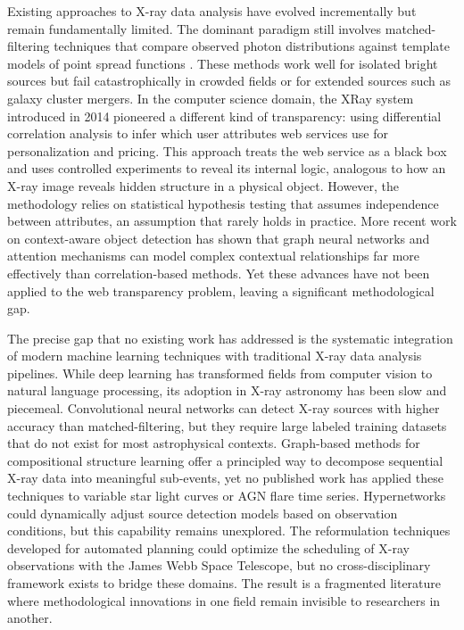 \documentclass[conference]{IEEEtran}
\begin{document}
Existing approaches to X-ray data analysis have evolved incrementally but remain fundamentally limited. The dominant paradigm still involves matched-filtering techniques that compare observed photon distributions against template models of point spread functions \cite{r3}. These methods work well for isolated bright sources but fail catastrophically in crowded fields or for extended sources such as galaxy cluster mergers. In the computer science domain, the XRay system introduced in 2014 \cite{r3} pioneered a different kind of transparency: using differential correlation analysis to infer which user attributes web services use for personalization and pricing. This approach treats the web service as a black box and uses controlled experiments to reveal its internal logic, analogous to how an X-ray image reveals hidden structure in a physical object. However, the methodology relies on statistical hypothesis testing that assumes independence between attributes, an assumption that rarely holds in practice. More recent work on context-aware object detection \cite{r9} has shown that graph neural networks and attention mechanisms can model complex contextual relationships far more effectively than correlation-based methods. Yet these advances have not been applied to the web transparency problem, leaving a significant methodological gap.

The precise gap that no existing work has addressed is the systematic integration of modern machine learning techniques with traditional X-ray data analysis pipelines. While deep learning has transformed fields from computer vision to natural language processing, its adoption in X-ray astronomy has been slow and piecemeal. Convolutional neural networks can detect X-ray sources with higher accuracy than matched-filtering, but they require large labeled training datasets that do not exist for most astrophysical contexts. Graph-based methods for compositional structure learning \cite{r4,r5} offer a principled way to decompose sequential X-ray data into meaningful sub-events, yet no published work has applied these techniques to variable star light curves or AGN flare time series. Hypernetworks \cite{r7} could dynamically adjust source detection models based on observation conditions, but this capability remains unexplored. The reformulation techniques developed for automated planning \cite{r8} could optimize the scheduling of X-ray observations with the James Webb Space Telescope, but no cross-disciplinary framework exists to bridge these domains. The result is a fragmented literature where methodological innovations in one field remain invisible to researchers in another.
\end{document}
